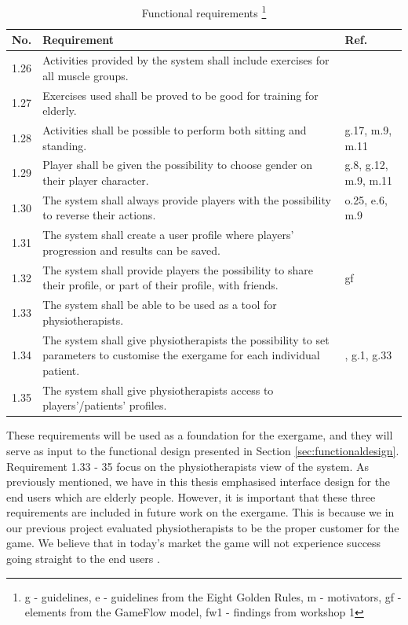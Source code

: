 \begin{minipage}{12 cm}
\begin{table} [H]
\centering
\begin{tabular}{|>{\raggedright}p{}|p{}|p{}|}
\hline
\textbf{No.} & \textbf{Requirement} & \textbf{Ref.} \\ \hline
1.26 & Activities provided by the system shall include exercises for all muscle groups. & \cite{guidelines} \\ \hline
1.27 & Exercises used shall be proved to be good for training for elderly. & \cite{project} \\ \hline
1.28 & Activities shall be possible to perform both sitting and standing. & g.17, m.9, m.11 \\ \hline
1.29 & Player shall be given the possibility to choose gender on their player character. &  g.8, g.12, m.9, m.11 \\ \hline
1.30 & The system shall always provide players with the possibility to reverse their actions. & o.25, e.6, m.9 \\ \hline
1.31 & The system shall create a user profile where players' progression and results can be saved. & \cite{project} \\ \hline
1.32 & The system shall provide players the possibility to share their profile, or part of their profile, with friends. &  gf \\ \hline
1.33 & The system shall be able to be used as a tool for physiotherapists. & \cite{project} \\ \hline
1.34 & The system shall give physiotherapists the possibility to set parameters to customise the exergame for each individual patient. & \cite{project}, g.1, g.33  \\ \hline
1.35 & The system shall give physiotherapists access to players'/patients' profiles. & \cite{project}\\ \hline  
\end{tabular}
\caption[Functional requirements, part 3]{Functional requirements \footnote{g - guidelines, e - guidelines from the Eight Golden Rules, m - motivators, gf - elements from the GameFlow model, fw1 - findings from workshop 1}}
\label{tab:func3}
\end{table} 
\end{minipage}


These requirements will be used as a foundation for the exergame, and they will serve as input to the functional design presented in Section \ref{sec:functionaldesign}. Requirement 1.33 - 35 focus on the physiotherapists view of the system. As previously mentioned, we have in this thesis emphasised interface design for the end users which are elderly people. However, it is important that these three requirements are included in future work on the exergame. This is because we in our previous project \cite{project} evaluated physiotherapists to be the proper customer for the game. We believe that in today's market the game will not experience success going straight to the end users \cite{project}.  

